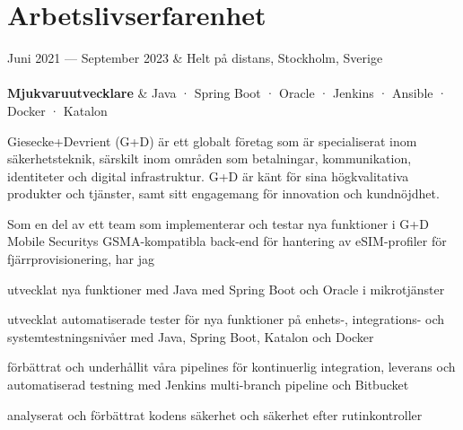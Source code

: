 \documentclass{cv-stylish}
\begin{document}
\begin{center}
\begin{adjustwidth}{1cm}{1cm}

\end{adjustwidth}


\section{Arbetslivserfarenhet}

\begin{JobTable}
  Juni 2021 --- September 2023 & \hfill Helt på distans, Stockholm, Sverige \\
   \\[3pt]
  \hspace{5mm} \textbf{Mjukvaruutvecklare}
  & \hfill Java · Spring Boot · Oracle · Jenkins · Ansible · Docker · Katalon \\
\end{JobTable}
\begin{adjustwidth}{0.015\linewidth}{0.015\linewidth}
Giesecke+Devrient (G+D) är ett globalt företag som är specialiserat
inom säkerhetsteknik, särskilt inom områden som betalningar,
kommunikation, identiteter och digital infrastruktur. G+D är känt
för sina högkvalitativa produkter och tjänster, samt sitt engagemang
för innovation och kundnöjdhet.

Som en del av ett team som implementerar och testar nya funktioner i
G+D Mobile Securitys GSMA-kompatibla back-end för hantering av eSIM-profiler för fjärrprovisionering, har jag

\begin{compactitem}
  \item utvecklat nya funktioner med Java med Spring Boot och Oracle i mikrotjänster
  \item utvecklat automatiserade tester för nya funktioner på enhets-, integrations- och
    systemtestningsnivåer med Java, Spring Boot, Katalon och Docker
  \item förbättrat och underhållit våra pipelines för kontinuerlig integration, leverans och automatiserad testning med Jenkins multi-branch
    pipeline och Bitbucket
  \item analyserat och förbättrat kodens säkerhet och säkerhet efter rutinkontroller
\end{compactitem}
\end{adjustwidth}


\end{center}
\end{document}
